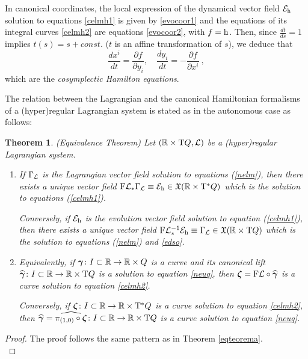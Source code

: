 \documentclass[12pt]{report}
\newtheorem{teor}{Theorem}[chapter]
\def\ben{\begin{enumerate}}
\def\een{\end{enumerate}}
\def\qed{\ifvmode\removelastskip\fi
{\unskip\nobreak\hfil\penalty50\hbox{}\nobreak\hfil
\hbox{\vrule height1.2ex width1.2ex}\parfillskip=0pt
\finalhyphendemerits=0 \par\smallskip}}
\def\vf{\mathfrak X}
\def\Lag{{\cal L}}
\def\Real{\mathbb{R}}
\def\Tan{{\rm T}}
\begin{document}
In canonical coordinates, the local expression 
of the dynamical vector field ${\cal E}_{\rm h}$ solution to equations 
\eqref{celmh1} is given by \eqref{evocoor1}
and the equations of its integral curves \eqref{celmh2} are
equations \eqref{evocoor2}, with $f={\rm h}$.
Then, since $\displaystyle\frac{dt}{ds}=1$ implies $t(s)=s+ const.$
($t$ is an affine transformation of $s$), we deduce that
$$
\frac{dx^i}{dt} = \frac{\partial f}{\partial y_i} ,\quad 
\frac{dy_i}{dt}= -\frac{\partial f}{\partial x^i}\ ,
$$
which are the {\sl cosymplectic Hamilton equations}.

The relation between the Lagrangian and the canonical Hamiltonian formalisms of a (hyper)regular Lagrangian system is stated as in the autonomous case as follows:

\begin{teor} {\rm (Equivalence Theorem)}
Let $(\Real\times\Tan Q,\Lag)$ be a (hyper)regular Lagrangian system.
\ben
\item
If $\Gamma_\Lag$ is the Lagrangian vector field 
solution to equations (\ref{nelm}),
then there exists a unique vector field
 ${\rm F}\Lag_*\Gamma_\Lag\equiv {\cal E}_{\rm h}\in\vf (\Real\times\Tan^*Q)$
which is the solution to equations (\ref{celmh1}).

Conversely, if ${\cal E}_{\rm h}$ is the evolution vector field
solution to equation (\ref{celmh1}),
then there exists a unique vector field
 ${\rm F}\Lag_*^{-1}{\cal E}_{\rm h}\equiv \Gamma_\Lag\in\vf (\Real\times\Tan Q)$
which is the solution to equations (\ref{nelm}) and \eqref{edso}.
\item
Equivalently, if $\mbox{\boldmath$\gamma$}\colon I\subset\Real\to\Real\times Q$ 
is a curve and its canonical lift
$\widehat{\mbox{\boldmath$\gamma$}} \colon I\subset\Real\to\Real\times\Tan Q$ is a
solution to equation \eqref{neuq},
then ${\mbox{\boldmath$\zeta$}}={\rm F}\Lag\circ\widehat{\mbox{\boldmath$\gamma$}}$ is a curve
solution to equation \eqref{celmh2}.

Conversely, if ${\mbox{\boldmath$\zeta$}}\colon I\subset\Real\to\Real\times\Tan^*Q$ 
is a curve solution to equation \eqref{celmh2},
then $\widehat{\mbox{\boldmath$\gamma$}}=\widehat{\pi_{(1,0)}\circ{\mbox{\boldmath$\zeta$}}} \colon I\subset\Real\to\Real\times\Tan Q$ 
is a curve solution to equation \eqref{neuq}.
\een
\label{4.26}
\end{teor}
\begin{proof}
The proof follows the same pattern as in Theorem \ref{eqteorema}.
\\ \qed\end{proof}
\end{document}
